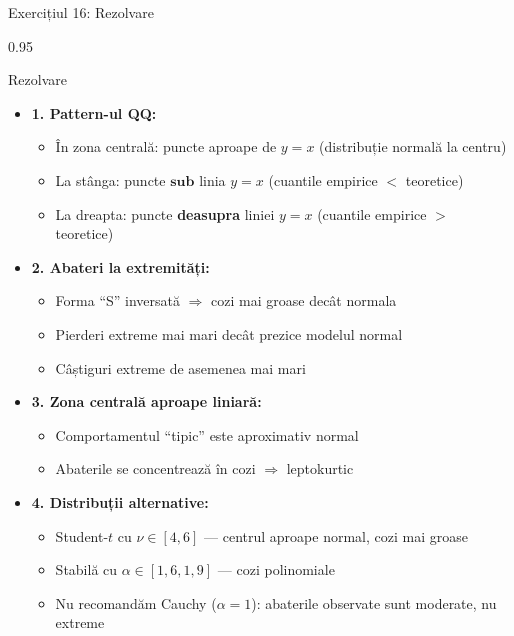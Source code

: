 \documentclass[9pt, aspectratio=169, t]{beamer}
\begin{document}
\begin{frame}[shrink=25]{Exercițiul 16: Rezolvare}
\begin{cminipage}{0.95\textwidth}
\begin{exampleblock}{Rezolvare}
\begin{itemize}\setlength{\itemsep}{0pt}
    \item \textbf{1. Pattern-ul QQ:}
    \begin{itemize}\setlength{\itemsep}{0pt}
        \item În zona centrală: puncte aproape de $y = x$ (distribuție normală la centru)
        \item La stânga: puncte $\mathbf{sub}$ linia $y = x$ (cuantile empirice $< $ teoretice)
        \item La dreapta: puncte \textbf{deasupra} liniei $y = x$ (cuantile empirice $>$ teoretice)
    \end{itemize}
    \item \textbf{2. Abateri la extremități:}
    \begin{itemize}\setlength{\itemsep}{0pt}
        \item Forma ``S'' inversată $\Rightarrow$ cozi mai groase decât normala
        \item Pierderi extreme mai mari decât prezice modelul normal
        \item Câștiguri extreme de asemenea mai mari
    \end{itemize}
    \item \textbf{3. Zona centrală aproape liniară:}
    \begin{itemize}\setlength{\itemsep}{0pt}
        \item Comportamentul ``tipic'' este aproximativ normal
        \item Abaterile se concentrează în cozi $\Rightarrow$ leptokurtic
    \end{itemize}
    \item \textbf{4. Distribuții alternative:}
    \begin{itemize}\setlength{\itemsep}{0pt}
        \item Student-$t$ cu $\nu \in [4, 6]$ --- centrul aproape normal, cozi mai groase
        \item Stabilă cu $\alpha \in [1{,}6, 1{,}9]$ --- cozi polinomiale
        \item Nu recomandăm Cauchy ($\alpha = 1$): abaterile observate sunt moderate, nu extreme
    \end{itemize}
\end{itemize}
\end{exampleblock}
\end{cminipage}
\end{frame}
\end{document}
